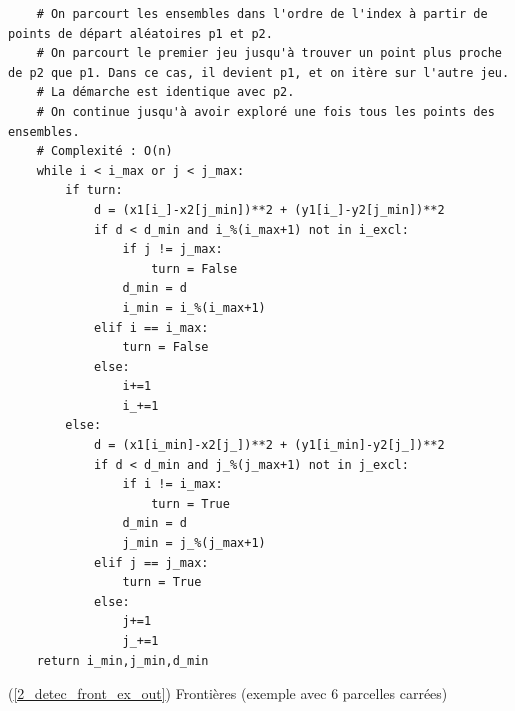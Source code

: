 \documentclass[12pt]{article}
\begin{document}
\begin{lstlisting}
    # On parcourt les ensembles dans l'ordre de l'index à partir de points de départ aléatoires p1 et p2.
    # On parcourt le premier jeu jusqu'à trouver un point plus proche de p2 que p1. Dans ce cas, il devient p1, et on itère sur l'autre jeu.
    # La démarche est identique avec p2.
    # On continue jusqu'à avoir exploré une fois tous les points des ensembles.
    # Complexité : O(n)
    while i < i_max or j < j_max:
        if turn:
            d = (x1[i_]-x2[j_min])**2 + (y1[i_]-y2[j_min])**2
            if d < d_min and i_%(i_max+1) not in i_excl:
                if j != j_max:
                    turn = False
                d_min = d
                i_min = i_%(i_max+1)
            elif i == i_max:
                turn = False
            else:
                i+=1
                i_+=1
        else:
            d = (x1[i_min]-x2[j_])**2 + (y1[i_min]-y2[j_])**2
            if d < d_min and j_%(j_max+1) not in j_excl:
                if i != i_max:
                    turn = True
                d_min = d
                j_min = j_%(j_max+1)
            elif j == j_max:
                turn = True
            else:
                j+=1
                j_+=1
    return i_min,j_min,d_min\end{lstlisting}

\newpage
    \label{2_detec_front_ex_in} (\ref{2_detec_front_ex_out}) Frontières (exemple avec 6 parcelles carrées)
\end{document}
